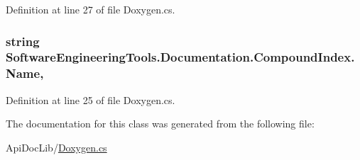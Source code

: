 Definition at line 27 of file Doxygen.\+cs.

\hypertarget{class_software_engineering_tools_1_1_documentation_1_1_compound_index_af6581fddcc01a475db082ad5ef186d23}{
\subsubsection[{Name}]{\setlength{\rightskip}{0pt plus 5cm}string Software\+Engineering\+Tools.\+Documentation.\+Compound\+Index.\+Name\hspace{0.3cm}{\ttfamily [get]}, {\ttfamily [set]}}}\label{class_software_engineering_tools_1_1_documentation_1_1_compound_index_af6581fddcc01a475db082ad5ef186d23}


Definition at line 25 of file Doxygen.\+cs.



The documentation for this class was generated from the following file\+:\begin{DoxyCompactItemize}
\item 
Api\+Doc\+Lib/\hyperlink{_doxygen_8cs}{Doxygen.\+cs}\end{DoxyCompactItemize}
